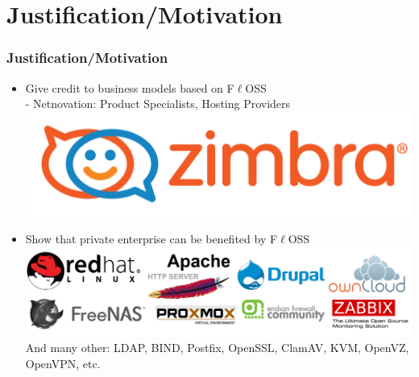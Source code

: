 \section{Justification/Motivation}

\begin{frame}
\frametitle{Justification/Motivation}

\begin{itemize}
  \item Give credit to business models based on F$\ell$OSS \\
  - Netnovation: Product Specialists, Hosting Providers \\
  \includegraphics[scale=0.1]{img/zimbra.png}
  
  \item Show that private enterprise can be benefited by F$\ell$OSS \\
  \includegraphics[scale=0.1]{img/multiple-logos.png} \\
  And many other: LDAP, BIND, Postfix, OpenSSL, ClamAV, KVM, OpenVZ, OpenVPN, etc.
  
\end{itemize}
\end{frame}